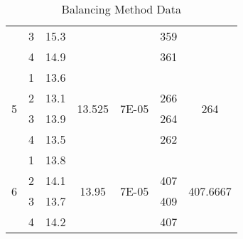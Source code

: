 \begin{table}[H]
{\begin{tabular}{|c|c|c|c|c|c|c|}
	 & 3 & 15.3 &  &  & 359 &  \\ \cline{2-3} \cline{6-6}
	 & 4 & 14.9 &  &  & 361 &  \\ \hline
	\multirow{4}{*}{5} & 1 & 13.6 & \multirow{4}{*}{13.525} & \multirow{4}{*}{7E-05} &  & \multirow{4}{*}{264} \\ \cline{2-3} \cline{6-6}
	 & 2 & 13.1 &  &  & 266 &  \\ \cline{2-3} \cline{6-6}
	 & 3 & 13.9 &  &  & 264 &  \\ \cline{2-3} \cline{6-6}
	 & 4 & 13.5 &  &  & 262 &  \\ \hline
	\multirow{4}{*}{6} & 1 & 13.8 & \multirow{4}{*}{13.95} & \multirow{4}{*}{7E-05} &  & \multirow{4}{*}{407.6667} \\ \cline{2-3} \cline{6-6}
	 & 2 & 14.1 &  &  & 407 &  \\ \cline{2-3} \cline{6-6}
	 & 3 & 13.7 &  &  & 409 &  \\ \cline{2-3} \cline{6-6}
	 & 4 & 14.2 &  &  & 407 &  \\ \hline
	\end{tabular}%
	}
	\caption{Balancing Method Data}
	\label{tab:2}
\end{table}